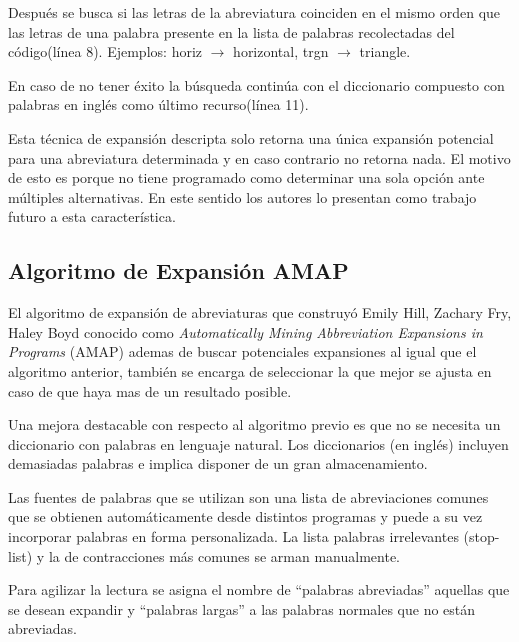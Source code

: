 \documentclass[a4paper,12pt]{report}
\begin{document}
Después se busca si las letras de la abreviatura coinciden en el mismo orden que las letras de una palabra presente en la lista de palabras recolectadas del código(línea 8). Ejemplos: \textsf{horiz} $\rightarrow$ \textsf{horizontal}, \textsf{trgn} $\rightarrow$ \textsf{triangle}.

En caso de no tener éxito la búsqueda continúa con el diccionario compuesto con palabras en inglés como último recurso(línea 11).


Esta técnica de expansión descripta solo retorna una única expansión potencial para una abreviatura determinada y en caso contrario no retorna nada. El motivo de esto es porque no tiene programado como determinar una sola opción ante múltiples alternativas. En este sentido los autores lo presentan como trabajo futuro a esta característica\cite{LFBEX07,EZH08}.

\subsection{Algoritmo de Expansión AMAP}

El algoritmo de expansión de abreviaturas que construyó Emily Hill, Zachary Fry, Haley Boyd\cite{EZH08} conocido como \textit{Automatically Mining Abbreviation Expansions in Programs} (AMAP) ademas de buscar potenciales expansiones al igual que el algoritmo anterior, también se encarga de seleccionar la que mejor se ajusta en caso de que haya mas de un resultado posible.

Una mejora destacable con respecto al algoritmo previo es que no se necesita un diccionario con palabras en lenguaje natural. Los diccionarios (en inglés) incluyen demasiadas palabras e implica disponer de un gran almacenamiento. 

Las fuentes de palabras que se utilizan son una lista de abreviaciones comunes que se obtienen automáticamente desde distintos programas y puede a su vez incorporar palabras en forma personalizada. La lista palabras irrelevantes (stop-list) y la de contracciones más comunes se arman manualmente.

Para agilizar la lectura se asigna el nombre de “palabras abreviadas” aquellas que se desean expandir y “palabras largas” a las palabras normales que no están abreviadas.
\end{document}
